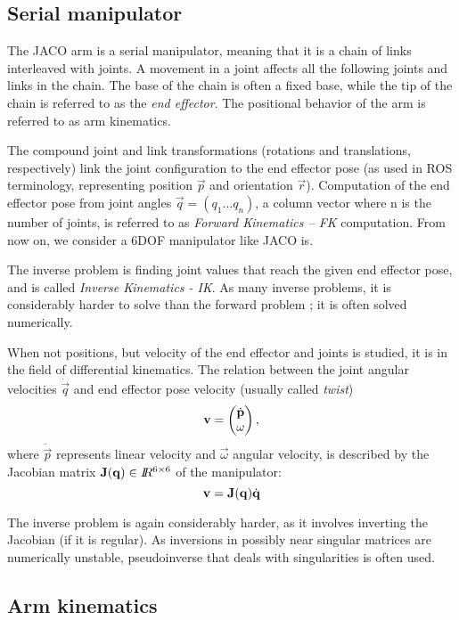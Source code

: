 \documentclass[buriama8_dp.tex]{subfiles}
\begin{document}
\subsection{Serial manipulator}
\label{subsec:arm_theory}

The JACO arm is a serial manipulator, meaning that it is a chain of links interleaved with joints. A movement in a joint affects all the following joints and links in the chain. The base of the chain is often a fixed base, while the tip of the chain is referred to as the \emph{end effector}. The positional behavior of the arm is referred to as arm kinematics.

The compound joint and link transformations (rotations and translations, respectively) link the joint configuration to the end effector pose (as used in ROS terminology, representing position \(\vec p\) and orientation \(\vec r\)). Computation of the end effector pose from joint angles \(\vec q = (q_1 \ldots q_n)\), a column vector where \m n is the number of joints, is referred to as \emph{Forward Kinematics -- FK} computation. From now on, we consider a 6DOF manipulator like JACO is.

The inverse problem is finding joint values that reach the given end effector pose, and is called \emph{Inverse Kinematics - IK}. As many inverse problems, it is considerably harder to solve than the forward problem \cite[sec. 2.12]{manipulators}; it is often solved numerically.

When not positions, but velocity of the end effector and joints is studied, it is in the field of differential kinematics. The relation between the joint angular velocities \(\dot{\vec q}\) and end effector pose velocity (usually called \emph{twist})
\[\vec v = \colvec{\dot{\vec p}}{\vec \omega},\]
where \(\dot{\vec p}\) represents linear velocity and \(\vec \omega\) angular velocity, is described by the Jacobian matrix \(\mathbf{J}(\mathbf{q}) \in I\!\!R^{6 \times 6}\) of the manipulator:
\[
  \mathbf{v} = \mathbf{J}(\mathbf{q})\dot{\mathbf{q}}
\]

The inverse problem is again considerably harder, as it involves inverting the Jacobian (if it is regular). As inversions in possibly near singular matrices are numerically unstable, pseudoinverse that deals with singularities is often used.

\subsection{Arm kinematics}
\label{subsec:arm_kinematics}
\end{document}
